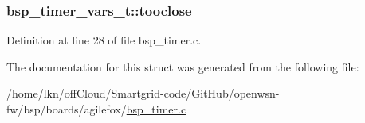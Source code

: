 \subsubsection[{\texorpdfstring{tooclose}{tooclose}}]{ bsp\+\_\+timer\+\_\+vars\+\_\+t\+::tooclose}\hypertarget{structbsp__timer__vars__t_a70c4bae3d2bb518f2c1d106a51f44742}{}\label{structbsp__timer__vars__t_a70c4bae3d2bb518f2c1d106a51f44742}


Definition at line 28 of file bsp\+\_\+timer.\+c.



The documentation for this struct was generated from the following file\+:\begin{DoxyCompactItemize}
\item 
/home/lkn/off\+Cloud/\+Smartgrid-\/code/\+Git\+Hub/openwsn-\/fw/bsp/boards/agilefox/\hyperlink{agilefox_2bsp__timer_8c}{bsp\+\_\+timer.\+c}\end{DoxyCompactItemize}
